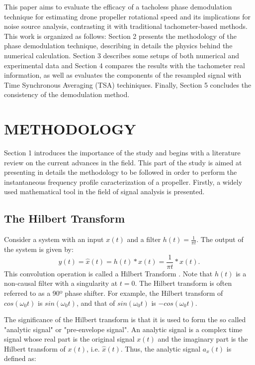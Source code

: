 \documentclass[10pt,fleqn,a4paper,twoside]{article}
\begin{document}
This paper aims to evaluate the efficacy of a tacholess phase demodulation technique for estimating drone propeller rotational speed and its implications for noise source analysis, contrasting it with traditional tachometer-based methods. This work is organized as follows: Section 2 presents the methodology of the phase demodulation technique, describing in details the physics behind the numerical calculation. Section 3 describes some setups of both numerical and experimental data and Section 4 compares the results with the tachometer real information, as well as evaluates the components of the resampled signal with Time Synchronous Averaging (TSA) techiniques. Finally, Section 5 concludes the consistency of the demodulation method.

\section{METHODOLOGY}
Section 1 introduces the importance of the study and begins with a literature review on the current advances in the field. This part of the study is aimed at presenting in details the methodology to be followed in order to perform the instantaneous frequency profile caracterization of a propeller. Firstly, a widely used mathematical tool in the field of signal analysis is presented. 

\subsection{The Hilbert Transform}

Consider a system with an input $x(t)$ and a filter $h(t) = \frac{1}{\pi t}$. The output of the system is given by:
\begin{equation}
    y(t) = \hat{x}(t) =  h(t) * x(t) = \frac{1}{\pi t} * x(t).
    \label{eq1}
\end{equation}
This convolution operation is called a Hilbert Transform \citep{shin}. Note that $h(t)$ is a non-causal filter with a singularity at $t=0$. The Hilbert transform is often referred to as a 90º phase shifter. For example, the Hilbert transform of $cos(\omega_{0} t)$ is $sin(\omega_{0} t)$, and that of $sin(\omega_{0} t)$ is $-cos(\omega_{0} t)$.

The significance of the Hilbert transform is that it is used to form the so called "analytic signal" or "pre-envelope signal". An analytic signal is a complex time signal whose real part is the original signal $x(t)$ and the    imaginary part is the Hilbert transform of $x(t)$, i.e. $\hat{x}(t)$. Thus, the analytic signal $a_{x} (t)$ is defined as:
\end{document}
